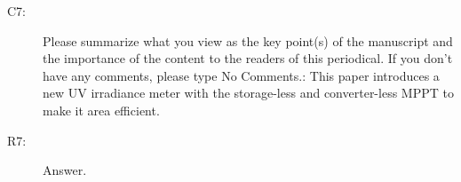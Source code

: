 \documentclass[onecolumn]{IEEEconf}
\begin{document}
\begin{description}
\item [C7: ] Please summarize what you view as the key point(s) of the manuscript and the importance of the content to the readers of this periodical. If you don't have any comments, please type No Comments.: This paper introduces a new UV irradiance meter with the storage-less and converter-less MPPT to make it area efficient.
\item [R7: ] Answer.\\
~\\


%
%
%
%
%
\end{description}
\end{document}
